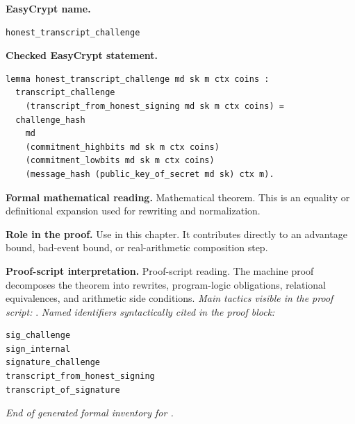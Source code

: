 \begin{formaltheorem}
\noindent\textbf{EasyCrypt name.}
\begin{lstlisting}[language=EasyCrypt,basicstyle=\ttfamily\scriptsize]
honest_transcript_challenge
\end{lstlisting}
\noindent\textbf{Checked EasyCrypt statement.}
\begin{lstlisting}[language=EasyCrypt,basicstyle=\ttfamily\scriptsize]
lemma honest_transcript_challenge md sk m ctx coins :
  transcript_challenge
    (transcript_from_honest_signing md sk m ctx coins) =
  challenge_hash
    md
    (commitment_highbits md sk m ctx coins)
    (commitment_lowbits md sk m ctx coins)
    (message_hash (public_key_of_secret md sk) ctx m).
\end{lstlisting}
\noindent\textbf{Formal mathematical reading.}
Mathematical theorem. This is an equality or definitional expansion used for rewriting and normalization.

\noindent\textbf{Role in the proof.}
Use in this chapter. It contributes directly to an advantage bound, bad-event bound, or real-arithmetic composition step.

\noindent\textbf{Proof-script interpretation.}
Proof-script reading. The machine proof decomposes the theorem into rewrites, program-logic obligations, relational equivalences, and arithmetic side conditions.
\emph{Main tactics visible in the proof script:} .
\emph{Named identifiers syntactically cited in the proof block:}
\begin{lstlisting}[language=EasyCrypt,basicstyle=\ttfamily\scriptsize]
sig_challenge
sign_internal
signature_challenge
transcript_from_honest_signing
transcript_of_signature
\end{lstlisting}

\end{formaltheorem}

\medskip
\noindent\emph{End of generated formal inventory for .}
